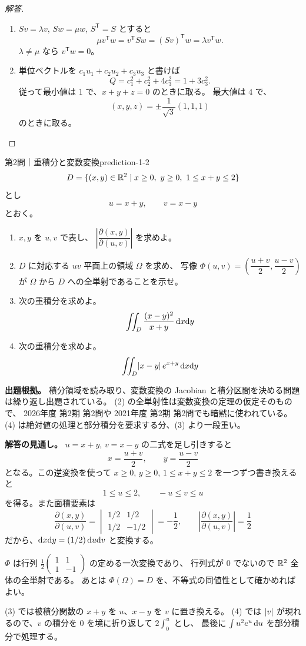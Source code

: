 \begin{proof}[解答]
\begin{enumerate}
  \item[(3)] $Sv=\lambda v$, $Sw=\mu w$, $S^{\mathsf T}=S$ とすると
  \[
  \mu v^{\mathsf T}w=v^{\mathsf T}Sw=(Sv)^{\mathsf T}w
  =\lambda v^{\mathsf T}w.
  \]
  $\lambda\ne\mu$ なら $v^{\mathsf T}w=0$。

  \item[(4)] 単位ベクトルを $c_1u_1+c_2u_2+c_3u_3$ と書けば
  \[
  Q=c_1^2+c_2^2+4c_3^2=1+3c_3^2.
  \]
  従って最小値は $1$ で、$x+y+z=0$ のときに取る。
  最大値は $4$ で、
  \[
  (x,y,z)=\pm\frac1{\sqrt3}(1,1,1)
  \]
  のときに取る。
\end{enumerate}
\end{proof}

\begin{problem}{第2問｜重積分と変数変換}{prediction-1-2}
\[
D=\{(x,y)\in\mathbb{R}^2\mid x\ge0,\ y\ge0,\ 1\le x+y\le2\}
\]
とし
\[
u=x+y,\qquad v=x-y
\]
とおく。
\begin{enumerate}
  \item[(1)] $x,y$ を $u,v$ で表し、
  $\left|\dfrac{\partial(x,y)}{\partial(u,v)}\right|$ を求めよ。
  \item[(2)] $D$ に対応する $uv$ 平面上の領域 $\Omega$ を求め、
  写像 $\Phi(u,v)=\left(\dfrac{u+v}2,\dfrac{u-v}2\right)$ が
  $\Omega$ から $D$ への全単射であることを示せ。
  \item[(3)] 次の重積分を求めよ。
  \[
  \iint_D\frac{(x-y)^2}{x+y}\,\mathrm{d} x\mathrm{d} y
  \]
  \item[(4)] 次の重積分を求めよ。
  \[
  \iint_D\lvert x-y \rvert\,e^{x+y}\,\mathrm{d} x\mathrm{d} y
  \]
\end{enumerate}
\end{problem}
\begin{memo*}
\textbf{出題根拠。}
積分領域を読み取り、変数変換の Jacobian と積分区間を決める問題は繰り返し出題されている。
(2) の全単射性は変数変換の定理の仮定そのもので、
2026年度 第2期 第2問や 2021年度 第2期 第2問でも暗黙に使われている。
(4) は絶対値の処理と部分積分を要求する分、(3) より一段重い。

\textbf{解答の見通し。}
$u=x+y$, $v=x-y$ の二式を足し引きすると
\[
x=\frac{u+v}{2},\qquad y=\frac{u-v}{2}
\]
となる。この逆変換を使って
$x\ge0$, $y\ge0$, $1\le x+y\le2$ を一つずつ書き換えると
\[
1\le u\le2,\qquad -u\le v\le u
\]
を得る。また面積要素は
\[
\frac{\partial(x,y)}{\partial(u,v)}
=\begin{vmatrix}1/2&1/2\\1/2&-1/2\end{vmatrix}
=-\frac12,
\qquad
\left|\frac{\partial(x,y)}{\partial(u,v)}\right|=\frac12
\]
だから、$\mathrm{d} x\mathrm{d} y=(1/2)\,\mathrm{d} u\mathrm{d} v$ と変換する。

$\Phi$ は行列 $\frac12\begin{pmatrix}1&1\\1&-1\end{pmatrix}$ の定める一次変換であり、
行列式が $0$ でないので $\mathbb{R}^2$ 全体の全単射である。
あとは $\Phi(\Omega)=D$ を、不等式の同値性として確かめればよい。

(3) では被積分関数の $x+y$ を $u$、$x-y$ を $v$ に置き換える。
(4) では $\lvert v \rvert$ が現れるので、$v$ の積分を $0$ を境に折り返して $2\int_0^u$ とし、
最後に $\int u^2e^u\,\mathrm{d} u$ を部分積分で処理する。
\end{memo*}

